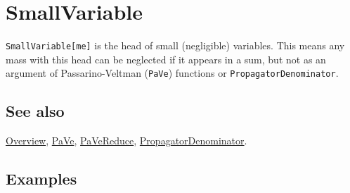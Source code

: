 \documentclass[../FeynCalcManual.tex]{subfiles}
\begin{document}
\hypertarget{smallvariable}{
\section{SmallVariable}\label{smallvariable}}

\texttt{SmallVariable[\allowbreak{}me]} is the head of small
(negligible) variables. This means any mass with this head can be
neglected if it appears in a sum, but not as an argument of
Passarino-Veltman (\texttt{PaVe}) functions or
\texttt{PropagatorDenominator}.

\subsection{See also}

\hyperlink{toc}{Overview}, \hyperlink{pave}{PaVe},
\hyperlink{pavereduce}{PaVeReduce},
\hyperlink{propagatordenominator}{PropagatorDenominator}.

\subsection{Examples}
\end{document}
